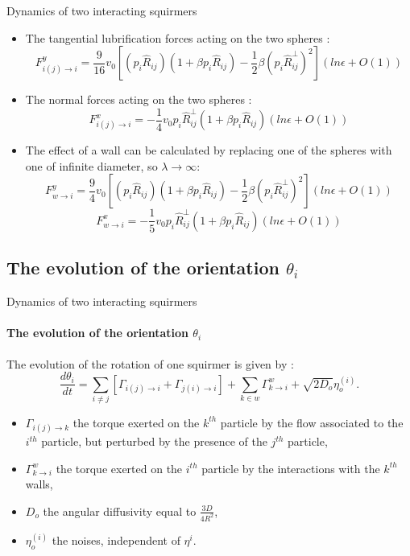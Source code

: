 \documentclass{beamer}
\begin{document}
\begin{frame}{Dynamics of two interacting squirmers}
    \begin{itemize}
        \item The tangential lubrification forces acting on the two spheres : \begin{equation*}
            \boxed{
F_{i(j)\rightarrow i}^{y} = \frac{9}{16}v_0
\left[(p_i\hat{R}_{ij})(1 + \beta p_i\hat{R}_{ij}) - \frac{1}{2}\beta(p_i\hat{R}^{\perp}_{ij})^2\right](ln \epsilon + O(1))
}
\end{equation*}
    \item The normal forces acting on the two spheres :
    \begin{equation*}
\boxed{F_{i(j)\rightarrow i}^{x} = -\frac{1}{4}v_0p_i\hat{R}^{\perp}_{ij}(1 + \beta p_i\hat{R}_{ij})(ln \epsilon + O(1))}
\end{equation*}
    \item The effect of a wall can be calculated by replacing one of the spheres with one of infinite diameter, so $\lambda\rightarrow\infty$:
    \begin{equation*}
        \boxed{F_{w\rightarrow i}^{y} = \frac{9}{4} v_0
        \left[(p_i\hat{R}_{ij})(1 + \beta p_i\hat{R}_{ij}) - \frac{1}{2}\beta(p_i\hat{R}^{\perp}_{ij})^2\right](ln \epsilon + O(1))}
    \end{equation*}
    \begin{equation*}
        \boxed{F_{w\rightarrow i}^{x} = -\frac{1}{5} v_0p_i\hat{R}^{\perp}_{ij}(1 + \beta p_i\hat{R}_{ij})(ln \epsilon + O(1))}
    \end{equation*}
    \end{itemize}
\end{frame}
    
\subsection{The evolution of the orientation $\theta _i$}
\begin{frame}{Dynamics of two interacting squirmers}
        \framesubtitle{The evolution of the orientation $\theta _i$}
    The evolution of the rotation of one squirmer is given by : 
    $$
    \frac{d \theta_i}{dt} = \sum\limits_{i\ne j} \left[\Gamma_{i(j)\rightarrow i} + \Gamma_{j(i)\rightarrow i}\right] + \sum\limits_{k\in w} \Gamma_{k\rightarrow i}^w + \sqrt{2D_o} \eta_o^{(i)}.
    $$ 
    \begin{itemize}
        \item $\Gamma_{i(j)\rightarrow k}$ the torque exerted on the $k^{th}$ particle by the flow associated to the $i^{th}$ particle, but perturbed by the presence of the $j^{th}$ particle,
        \item $\Gamma_{k\rightarrow i}^w$ the torque exerted on the $i^{th}$ particle by the interactions with the $k^{th}$ walls,
        \item $D_o$ the angular diffusivity equal to $\frac{3D}{4R^2}$,
        \item $\eta_o^{(i)}$ the noises, independent of $\eta^{i}$.
    \end{itemize}
\end{frame}
\end{document}
